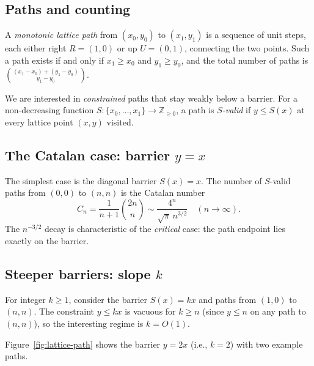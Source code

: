 \documentclass[11pt]{article}
\theoremstyle{definition}
\theoremstyle{remark}
\newcommand{\Z}{\mathbb{Z}}
\begin{document}
\subsection{Paths and counting}

A \emph{monotonic lattice path} from $(x_0, y_0)$ to $(x_1, y_1)$ is a
sequence of unit steps, each either right $R = (1, 0)$ or up $U = (0, 1)$,
connecting the two points.
Such a path exists if and only if $x_1 \geq x_0$ and $y_1 \geq y_0$,
and the total number of paths is $\binom{(x_1-x_0) + (y_1-y_0)}{y_1-y_0}$.

We are interested in \emph{constrained} paths that stay weakly below
a barrier.
For a non-decreasing function $S \colon \{x_0, \ldots, x_1\} \to \Z_{\geq 0}$,
a path is \emph{$S$-valid} if $y \leq S(x)$ at every lattice point
$(x, y)$ visited.

\subsection{The Catalan case: barrier \texorpdfstring{$y = x$}{y = x}}

The simplest case is the diagonal barrier $S(x) = x$.
The number of $S$-valid paths from $(0, 0)$ to $(n, n)$ is the
Catalan number
\[
C_n = \frac{1}{n+1}\binom{2n}{n} \sim \frac{4^n}{\sqrt{\pi}\, n^{3/2}}
\quad (n \to \infty).
\]
The $n^{-3/2}$ decay is characteristic of the \emph{critical} case:
the path endpoint lies exactly on the barrier.

\subsection{Steeper barriers: slope \texorpdfstring{$k$}{k}}

For integer $k \geq 1$, consider the barrier $S(x) = kx$ and paths from
$(1, 0)$ to $(n, n)$.
The constraint $y \leq kx$ is vacuous for $k \geq n$ (since $y \leq n$
on any path to $(n, n)$), so the interesting regime is $k = O(1)$.

Figure~\ref{fig:lattice-path} shows the barrier $y = 2x$ (i.e., $k = 2$)
with two example paths.
\end{document}
